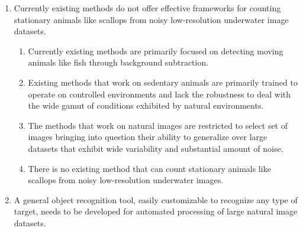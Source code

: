 \documentclass {udthesis}
\begin{document}
\begin{enumerate}[label=Section \arabic*:, start=0]
  \begin{enumerate} [label=Para \arabic*:, start=1]
   
   \item Proof of concept studies for validating scallop recognition algorithms are often tested on artificial scallop beds with controlled conditions that do not represent the variability of environmental conditions observed in natural images.
   
   \item Previous scallop recognition efforts on natural image datasets are limited to small set of few tens of images which do represent the ability of the algorithms to generalize on large databases containing thousands to millions of images. 
   
  \end{enumerate}

\item Currently existing methods do not offer effective frameworks for counting stationary animals like scallops from noisy low-resolution underwater image datasets.

  \begin{enumerate} [label=Para \arabic*:, start=1]
   
   \item Currently existing methods are primarily focused on detecting moving animals like fish through background subtraction.
   
   \item Existing methods that work on sedentary animals are primarily trained to operate on controlled environments and lack the robustness to deal with the wide gamut of conditions exhibited by natural environments.
   
   \item The methods that work on natural images are restricted to select set of images bringing into question their ability to generalize over large datasets that exhibit wide variability and substantial amount of noise.
   
   \item There is no existing method that can count stationary animals like scallops from noisy low-resolution underwater images.   
   
  \end{enumerate}


\item A general object recognition tool, easily customizable to recognize any type of target, needs to be developed for automated processing of large natural image datasets. 


\end{enumerate}
\end{document}
